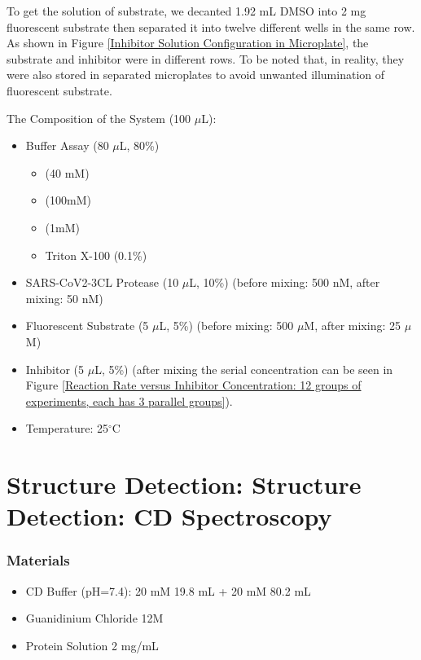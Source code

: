 \documentclass{report}
\begin{document}
To get the solution of substrate, we decanted 1.92 mL DMSO into 2 mg fluorescent substrate then separated it into twelve different wells in the same row.
As shown in Figure \ref{Inhibitor Solution Configuration in Microplate}, the substrate and inhibitor were in different rows.
To be noted that, in reality, they were also stored in separated microplates to avoid unwanted illumination of fluorescent substrate.

The Composition of the System (100 $\mu$L):
\begin{itemize}
    \item Buffer Assay (80 $\mu$L, 80\%)
    \begin{itemize}
        \item {} (40 mM)
        \item {} (100mM)
        \item {} (1mM)
        \item Triton X-100 (0.1\%)
    \end{itemize}
    \item SARS-CoV2-3CL Protease (10 $\mu$L, 10\%) (before mixing: 500 nM, after mixing: 50 nM)
    \item Fluorescent Substrate (5 $\mu$L, 5\%) (before mixing: 500 $\mu$M, after mixing: 25 $\mu$M)
    \item Inhibitor (5 $\mu$L, 5\%) (after mixing the serial concentration can be seen in Figure \ref{Reaction Rate versus Inhibitor Concentration: 12 groups of experiments, each has 3 parallel groups}).
    \item Temperature: 25$^\circ$C
\end{itemize}

\section{Structure Detection: Structure Detection: CD Spectroscopy}
\subsubsection{Materials}
\begin{itemize}
    \item CD Buffer (pH=7.4):  20 mM 19.8 mL +  20 mM 80.2 mL
    \item Guanidinium Chloride 12M
    \item Protein Solution 2 mg/mL 
\end{itemize}
\end{document}
